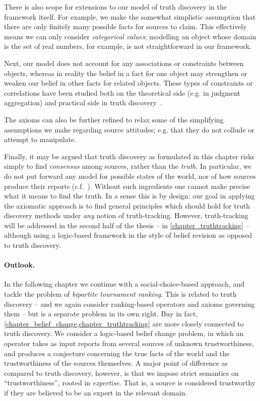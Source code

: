 There is also scope for extensions to our model of truth discovery in the
framework itself. For example, we make the somewhat simplistic assumption that
there are only finitely many possible facts for sources to claim. This
effectively means we can only consider \emph{categorical values}; modelling an
object whose domain is the set of real numbers, for example, is not
straightforward in our framework.

Next, our model does not account for any associations or constraints between
objects, whereas in reality the belief in a fact for one object may strengthen
or weaken our belief in other facts for related objects. These types of
constraints or correlations have been studied both on the theoretical side
(e.g. in judgment aggregation) and practical side in truth
discovery~\cite{yang_probabilistic_2019}.

The axioms can also be further refined to relax some of the simplifying
assumptions we make regarding source attitudes; e.g. that they do not collude
or attempt to manipulate.

Finally, it may be argued that truth discovery as formulated in this chapter
risks simply to find \emph{consensus} among sources, rather than the
\emph{truth}. In particular, we do not put forward any model for possible
states of the world, nor of how sources produce their reports
(c.f.~\cite{meir_proxy_2019}). Without such ingredients one cannot make precise
what it means to find the truth. In a sense this is by design: our goal in
applying the axiomatic approach is to find general principles which should hold
for truth discovery methods under \emph{any} notion of truth-tracking.
However, truth-tracking will be addressed in the second half of the thesis --
in \cref{chapter_truthtracking} -- although using a logic-based framework in
the style of belief revision as opposed to truth discovery.

\paragraph{Outlook.}

In the following chapter we continue with a social-choice-based approach, and
tackle the problem of \emph{bipartite tournament ranking}. This is related to
truth discovery -- and we again consider ranking-based operators and axioms
governing them -- but is a separate problem in its own right.
%
Buy in fact, \cref{chapter_belief_change,chapter_truthtracking} are more
closely connected to truth discovery. We consider a logic-based belief change
problem, in which an operator takes as input reports from several sources of
unknown trustworthiness, and produces a conjecture concerning the true facts of
the world and the trustworthiness of the sources themselves. A major point of
difference as compared to truth discovery, however, is that we impose strict
semantics on ``trustworthiness'', rooted in \emph{expertise}. That is, a source
is considered trustworthy if they are believed to be an expert in the relevant
domain.
